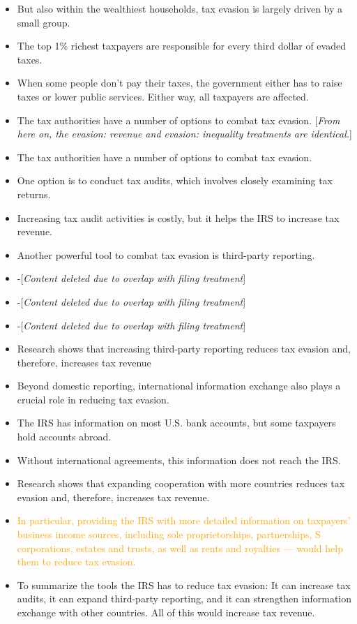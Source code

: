 \documentclass[11pt]{article}
\newcommand{\tk}[1]{\textcolor{orange}{#1}}
\begin{document}
\begin{itemize}
    \item But also within the wealthiest households, tax evasion is largely driven by a small group. 
    \item The top 1\% richest taxpayers are responsible for every third dollar of evaded taxes.  
    \item When some people don’t pay their taxes, the government either has to raise taxes or lower public services. Either way, all taxpayers are affected.
    \item The tax authorities have a number of options to combat tax evasion. [\textit{From here on, the evasion: revenue and evasion: inequality treatments are identical.}]
    \item The tax authorities have a number of options to combat tax evasion.
    \item One option is to conduct tax audits, which involves closely examining tax returns.
    \item Increasing tax audit activities is costly, but it helps the IRS to increase tax revenue.
    \item Another powerful tool to combat tax evasion is third-party reporting. 
    \item -[\textit{Content deleted due to overlap with filing treatment}]
    \item -[\textit{Content deleted due to overlap with filing treatment}]
    \item -[\textit{Content deleted due to overlap with filing treatment}]
    \item Research shows that increasing third-party reporting reduces tax evasion and, therefore, increases tax revenue
    \item Beyond domestic reporting, international information exchange also plays a crucial role in reducing tax evasion. 
    \item The IRS has information on most U.S. bank accounts, but some taxpayers hold accounts abroad.
    \item Without international agreements, this information does not reach the IRS.
    \item Research shows that expanding cooperation with more countries reduces tax evasion and, therefore, increases tax revenue.
    \item \tk{In particular, providing the IRS with more detailed information on taxpayers’ business income sources, including sole proprietorships, partnerships, S corporations, estates and trusts, as well as rents and royalties — would help them to reduce tax evasion.}
    \item To summarize the tools the IRS has to reduce tax evasion: It can increase tax audits, it can expand third-party reporting, and it can strengthen information exchange with other countries. All of this would increase tax revenue.
\end{itemize}
\end{document}
